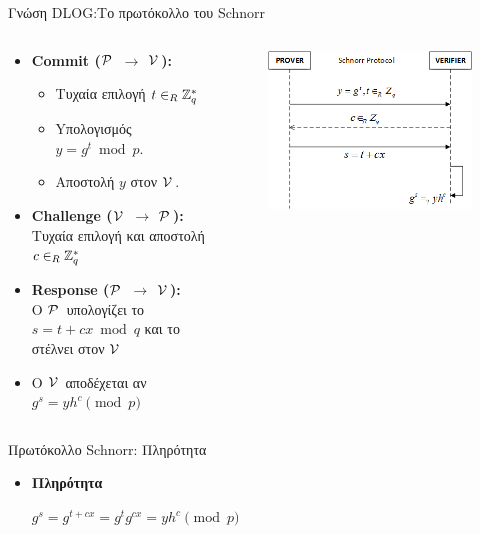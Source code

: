 \documentclass[10pt,handout]{beamer}
\begin{document}
\begin{frame}[allowframebreaks]{Γνώση DLOG:Το πρωτόκολλο του Schnorr}
\begin{columns}
\begin{small}
\begin{itemize}
\item  \textbf{Commit ($\mathcal{P}\,$ $\rightarrow$ $\mathcal{V}\,$):} 
\begin{itemize}
\item Τυχαία επιλογή $t \in_R \mathbb{Z}^*_{q}$ 
\item Yπολογισμός $y = g^t \bmod{p}$. 
\item Αποστολή $y$  στον $\mathcal{V}\,$. 
\end{itemize}
\item \textbf{Challenge ($\mathcal{V}\,$ $\rightarrow$ $\mathcal{P}\,$):} \\  Τυχαία επιλογή και αποστολή $c \in_R \mathbb{Z}^*_{q}$
\item \textbf{Response ($\mathcal{P}\,$ $\rightarrow$ $\mathcal{V}\,$):} \\   O $\mathcal{P}\,$ υπολογίζει το $s=t+cx \bmod{q}$ και το στέλνει στον $\mathcal{V}\,$
\item  Ο $\mathcal{V}\,$ αποδέχεται αν\\ $g^s = yh^c \pmod{p}$
\end{itemize}
\end{small}
\begin{figure}
\includegraphics[width=1\textwidth]{schnorr.png}
\end{figure}
\end{columns}
\end{frame}

\begin{frame}{Πρωτόκολλο Schnorr: Πληρότητα}
 
\begin{itemize}
\item \textbf{Πληρότητα}\\

\pause
\begin{center}
$g^s = g^{t+cx} = g^t g^{cx} = yh^c \pmod{p}$
\end{center}



\end{itemize}
\end{frame}
\end{document}

